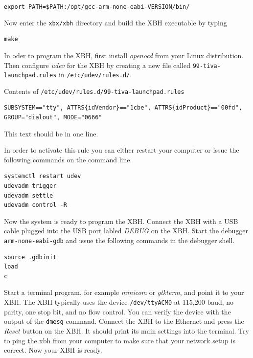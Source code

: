 \documentclass[twoside,11pt]{cergdoc}
\begin{document}
\begin{center}
\lstinline|export PATH=$PATH:/opt/gcc-arm-none-eabi-VERSION/bin/| 
\end{center}

Now enter the \verb|xbx/xbh| directory and build the XBH executable by typing 

\begin{lstlisting}
make
\end{lstlisting}

In oder to program the XBH, first install \emph{openocd} from your Linux distribution.
Then configure \emph{udev} for the XBH by creating a new file called
\texttt{99-tiva-launchpad.rules} in \verb|/etc/udev/rules.d/|.

\begin{cergbox}{Contents of \texttt{/etc/udev/rules.d/99-tiva-launchpad.rules}}
\small\begin{lstlisting}
SUBSYSTEM=="tty", ATTRS{idVendor}=="1cbe", ATTRS{idProduct}=="00fd", 
GROUP="dialout", MODE="0666"
\end{lstlisting}
This text should be in one line.
\end{cergbox}

In order to activate this rule you can either restart your computer or issue the
following commands on the command line.

\begin{lstlisting}
systemctl restart udev 
udevadm trigger
udevadm settle
udevadm control -R
\end{lstlisting}

Now the system is ready to program the XBH. Connect the XBH with a USB cable plugged into
the USB port labled \emph{DEBUG} on the XBH. Start the debugger \verb|arm-none-eabi-gdb|
and issue the following commands in the debugger shell.

\begin{lstlisting}
source .gdbinit
load
c
\end{lstlisting}

Start a terminal program, for example \emph{minicom} or \emph{gtkterm}, 
and point it to your XBH. The XBH typically uses the device \verb|/dev/ttyACM0| at 115,200 baud, no parity, 
one stop bit, and no flow control.
You can verify the device with the output of the \texttt{dmesg} command. Connect the XBH to the
Ethernet and press the \emph{Reset} button on the XBH. It should print its main 
settings into the terminal. Try to ping the xbh from your computer to make sure that your 
network setup is correct. Now your XBH is ready.
\end{document}
